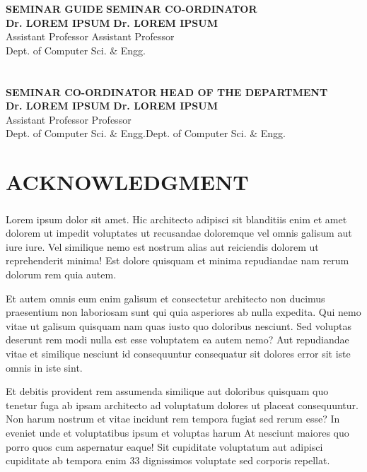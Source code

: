 \documentclass[a4paper,12pt]{report}
\begin{document}
\noindent
\textbf{SEMINAR GUIDE} \hspace{5.7cm} \textbf{SEMINAR CO-ORDINATOR} \\
\textbf{Dr. LOREM IPSUM}\hspace{7.0cm}\textbf{ Dr. LOREM IPSUM}\\
{Assistant Professor}\hspace{9cm} {Assistant Professor }\\
{Dept. of Computer Sci. \& Engg.}\hspace{4.3cm}{Dept. of Computer Sci. \& Engg.}\\
\\
\\
\textbf{SEMINAR CO-ORDINATOR} \hspace*{3cm}
\textbf{HEAD OF THE DEPARTMENT} \\
\textbf{Dr. LOREM IPSUM}\hspace{5.1cm} \textbf{Dr. LOREM IPSUM}\\
{Assistant Professor}\hspace{6.7cm}\hspace*{4.1cm}
Professor\\
{Dept. of Computer Sci. \& Engg.}\hspace{4.3cm}Dept. of Computer Sci. \& Engg.

\chapter*{\large{ACKNOWLEDGMENT}}
\thispagestyle{empty}
\paragraph{}
Lorem ipsum dolor sit amet. Hic architecto adipisci sit blanditiis enim et amet dolorem ut impedit voluptates ut recusandae doloremque vel omnis galisum aut iure iure. Vel similique nemo est nostrum alias aut reiciendis dolorem ut reprehenderit minima! Est dolore quisquam et minima repudiandae nam rerum dolorum rem quia autem. 


\par Et autem omnis eum enim galisum et consectetur architecto non ducimus praesentium non laboriosam sunt qui quia asperiores ab nulla expedita. Qui nemo vitae ut galisum quisquam nam quas iusto quo doloribus nesciunt. Sed voluptas deserunt rem modi nulla est esse voluptatem ea autem nemo? Aut repudiandae vitae et similique nesciunt id consequuntur consequatur sit dolores error sit iste omnis in iste sint. 

\par Et debitis provident rem assumenda similique aut doloribus quisquam quo tenetur fuga ab ipsam architecto ad voluptatum dolores ut placeat consequuntur. Non harum nostrum et vitae incidunt rem tempora fugiat sed rerum esse? In eveniet unde et voluptatibus ipsum et voluptas harum At nesciunt maiores quo porro quos cum aspernatur eaque! Sit cupiditate voluptatum aut adipisci cupiditate ab tempora enim 33 dignissimos voluptate sed corporis repellat. 
\end{document}
